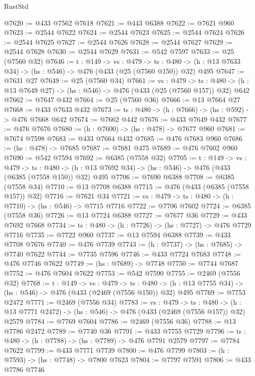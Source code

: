\begin{lexlean}{RustStd}
\begin{coremodule}
@7620 := @433 @7562 @7618
@7621 := @443 @6388
@7622 := @7621 @960
@7623 := @2544 @7622
@7624 := @2544 @7623
@7625 := @2544 @7624
@7626 := @2544 @7625
@7627 := @2544 @7626
@7628 := @2544 @7627
@7629 := @2544 @7628
@7630 := @2544 @7629
@7631 := @542 @7597
@7633 := @25 (@7560 @32)
@7646 := {t : @149} ->
  {vs : @479} ->
  {ts : @480} -> (h : @13 @7633 @34) -> (hs : @546) -> @476 (@433 (@25 (@7560 @150)) @32) @495
@7647 := @7631 @27
@7649 := @25 (@7560 @34)
@7661 := {vs : @479} ->
  {ts : @480} -> (h : @13 @7649 @27) -> (hs : @546) -> @476 (@433 (@25 (@7560 @157)) @32) @642
@7662 := @7647 @432
@7664 := @25 (@7560 @36)
@7666 := @13 @7664 @27
@7668 := @433 @7633 @432
@7673 := {ts : @480} -> (h : @7666) -> (hs : @592) -> @476 @7668 @642
@7674 := @7662 @442
@7676 := @433 @7649 @432
@7677 := @476 @7676
@7680 := (h : @7600) -> (hs : @478) -> @7677 @960
@7681 := @7674 @7598
@7683 := @433 @7664 @432
@7685 := @476 @7683 @960
@7686 := (hs : @478) -> @7685
@7687 := @7681 @475
@7689 := @476 @7602 @960
@7690 := @542 @7594
@7692 := @6385 (@7558 @32)
@7705 := {t : @149} ->
  {vs : @479} ->
  {ts : @480} -> (h : @13 @7692 @34) -> (hs : @546) -> @476 (@433 (@6385 (@7558 @150)) @32) @495
@7706 := @7690 @6388
@7708 := @6385 (@7558 @34)
@7710 := @13 @7708 @6388
@7715 := @476 (@433 (@6385 (@7558 @157)) @32)
@7716 := @7621 @34
@7721 := {vs : @479} -> {ts : @480} -> (h : @7710) -> (hs : @546) -> @7715 @7716
@7722 := @7706 @7602
@7724 := @6385 (@7558 @36)
@7726 := @13 @7724 @6388
@7727 := @7677 @36
@7729 := @433 @7692 @7668
@7734 := {ts : @480} -> (h : @7726) -> (hs : @7727) -> @476 @7729 @7716
@7735 := @7722 @960
@7737 := @13 @7594 @6388
@7739 := @433 @7708 @7676
@7740 := @476 @7739
@7743 := (h : @7737) -> (hs : @7685) -> @7740 @7622
@7744 := @7735 @7596
@7746 := @433 @7724 @7683
@7748 := @476 @7746 @7622
@7749 := (hs : @7689) -> @7748
@7750 := @7744 @7687
@7752 := @476 @7604 @7622
@7753 := @542 @7590
@7755 := @2469 (@7556 @32)
@7768 := {t : @149} ->
  {vs : @479} ->
  {ts : @480} -> (h : @13 @7755 @34) -> (hs : @546) -> @476 (@433 (@2469 (@7556 @150)) @32) @495
@7769 := @7753 @2472
@7771 := @2469 (@7556 @34)
@7783 := {vs : @479} ->
  {ts : @480} -> (h : @13 @7771 @2472) -> (hs : @546) -> @476 (@433 (@2469 (@7556 @157)) @32) @2579
@7784 := @7769 @7604
@7786 := @2469 (@7556 @36)
@7788 := @13 @7786 @2472
@7789 := @7740 @36
@7791 := @433 @7755 @7729
@7796 := {ts : @480} -> (h : @7788) -> (hs : @7789) -> @476 @7791 @2579
@7797 := @7784 @7622
@7799 := @433 @7771 @7739
@7800 := @476 @7799
@7803 := (h : @7593) -> (hs : @7748) -> @7800 @7623
@7804 := @7797 @7591
@7806 := @433 @7786 @7746

\end{coremodule}
\end{lexlean}
